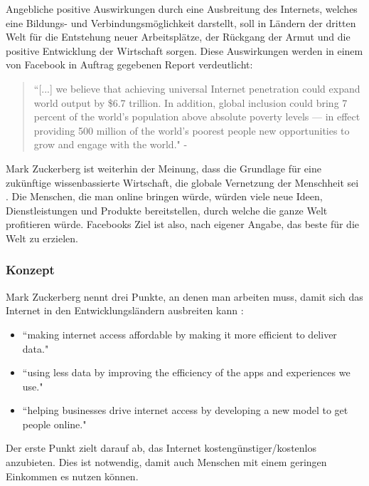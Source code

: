 \documentclass{article}
\begin{document}
Angebliche positive Auswirkungen durch eine Ausbreitung des Internets, welches eine Bildungs- und Verbindungsmöglichkeit darstellt, soll in Ländern der dritten Welt für die Entstehung neuer Arbeitsplätze, der Rückgang der Armut und die positive Entwicklung der Wirtschaft sorgen.
Diese Auswirkungen werden in einem von Facebook in Auftrag gegebenen Report verdeutlicht:

\begin{quote}
``[...] we believe that achieving universal Internet penetration could expand world output by \$6.7 trillion.  
In addition, global inclusion could bring 7 percent of the world’s population above absolute poverty levels — in effect providing 500 
million of the world’s poorest people new opportunities to grow and engage with the world." - \cite[11]{connectWorld}
\end{quote}

Mark Zuckerberg ist weiterhin der Meinung, dass die Grundlage für eine zukünftige wissenbassierte Wirtschaft, die globale Vernetzung der Menschheit sei \parencite{HumanRight}.
Die Menschen, die man online bringen würde, würden viele neue Ideen, Dienstleistungen und Produkte bereitstellen, durch welche die ganze Welt profitieren würde.
Facebooks Ziel ist also, nach eigener Angabe, das beste für die Welt zu erzielen.

\subsubsection{Konzept}
        
Mark Zuckerberg nennt drei Punkte, an denen man arbeiten muss, damit sich das Internet in den Entwicklungsländern ausbreiten kann
\parencite{HumanRight}:

\begin{itemize}
\item ``making internet access affordable by making it more efficient to deliver data."
\item ``using less data by improving the efficiency of the apps and experiences we use."
\item ``helping businesses drive internet access by developing a new model to get people online."  
\end{itemize}

Der erste Punkt zielt darauf ab, das Internet kostengünstiger/kostenlos anzubieten. 
Dies ist notwendig, damit auch Menschen mit einem geringen Einkommen es nutzen können.
\end{document}
